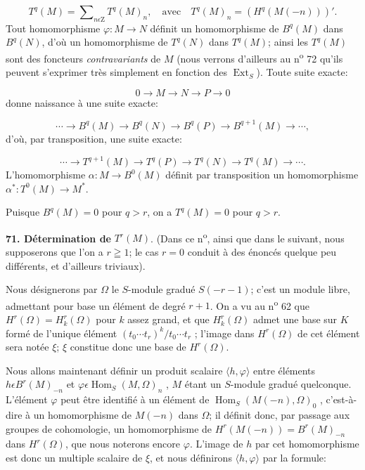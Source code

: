 \begin{equation*}
T^q(M) = \sum\nolimits_{n \epsilon \mathrm{Z}} T^q(M)_n , \quad \text{avec} \quad T^q(M)_n = (H^q(M(-n)))'.
\end{equation*}
Tout homomorphisme $\varphi : M \to N$ définit un homomorphisme de $B^q(M)$ dans $B^q(N)$, d'où un homomorphisme de $T^q(N)$ dans $T^q(M)$; ainsi les $T^q(M)$ sont des foncteurs \textit{contravariants} de $M$ (nous verrons d'ailleurs au n\textsuperscript{o} 72 qu'ils peuvent
s'exprimer très simplement en fonction des $\operatorname{Ext}_S$). Toute suite exacte:

\begin{equation*}
0 \to M \to N \to P \to 0
\end{equation*}
donne naissance à une suite exacte:

\begin{equation*}
\cdots \to B^q(M) \to B^q(N) \to B^q(P) \to B^{q+1}(M) \to \cdots ,
\end{equation*}
d'où, par transposition, une suite exacte:

\begin{equation*}
\cdots \to T^{q+1}(M) \to T^q(P) \to T^q(N) \to T^q(M) \to \cdots .
\end{equation*}
L'homomorphisme $\alpha : M \to B^0(M)$ définit par transposition un homomorphisme $\alpha^* : T^0(M) \to M^*$.

Puisque $B^q(M) = 0$ pour $q > r$, on a $T^q(M) = 0$ pour $q > r$.

\textbf{71. Détermination de} $T^r(M)$. (Dans ce n\textsuperscript{o}, ainsi que dans le suivant, nous supposerons que l'on a $r \geqq 1$; le cas $r = 0$ conduit à des énoncés quelque peu différents, et d'ailleurs triviaux).

Nous désignerons par $\Omega$ le $S$-module gradué $S(-r - 1)$; c'est un module libre, admettant pour base un élément de degré $r + 1$. On a vu au n\textsuperscript{o} 62 que $H^r(\Omega) = H_k^r(\Omega)$ pour $k$ assez grand, et que $H_k^r(\Omega)$ admet une base sur $K$ formé de l'unique élément $(t_0 \cdots t_r)^k/t_0 \cdots t_r$ ; l'image dans $H^r(\Omega)$ de cet élément sera notée $\xi$; $\xi$ constitue donc une base de $H^r(\Omega)$.

Nous allons maintenant définir un produit scalaire $\langle h, \varphi \rangle$ entre éléments $h \epsilon B^r(M)_{-n}$ et $\varphi \epsilon \operatorname{Hom}_S(M, \Omega)_n$ , $M$ étant un $S$-module gradué quelconque. L'élément $\varphi$ peut être identifié à un élément de $\operatorname{Hom}_S(M(-n), \Omega)_0$ , c'est-à-dire à un homomorphisme de $M(-n)$ dans $\Omega$; il définit donc, par passage aux groupes de cohomologie, un homomorphisme de $H^r(M(-n)) = B^r(M)_{-n}$ dans $H^r(\Omega)$, que nous noterons encore $\varphi$. L'image de $h$ par cet homomorphisme est donc un multiple scalaire de $\xi$, et nous définirons $\langle h, \varphi \rangle$ par la formule:

